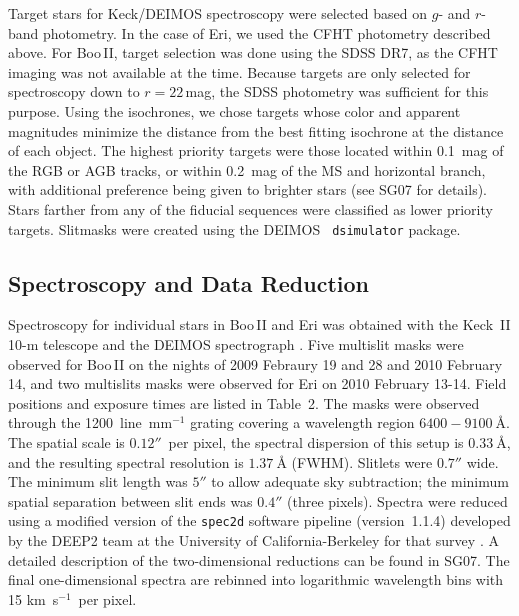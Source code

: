 \documentclass{../tex_files/emulateapj}
\newcommand{\kms}{\,km~s$^{-1}$}
\begin{document}
Target stars for Keck/DEIMOS spectroscopy were selected based on $g$-
and $r$-band photometry.  In the case of Eri, we used the CFHT
photometry described above.  For Boo\,II, target selection was done
using the SDSS DR7, as the CFHT imaging was not available at the time.
Because targets are only selected for spectroscopy down to $r =
22$\,mag, the SDSS photometry was sufficient for this purpose.  Using
the \citet{girardi02a} isochrones, we chose targets whose color and
apparent magnitudes minimize the distance from the best fitting
isochrone at the distance of each object.  The highest priority
targets were those located within 0.1~mag of the RGB or AGB tracks, or
within 0.2~mag of the MS and horizontal branch, with additional
preference being given to brighter stars (see SG07 for details).
Stars farther from any of the fiducial sequences were classified as
lower priority targets. Slitmasks were created using the DEIMOS {\tt
  dsimulator} package.



\subsection{Spectroscopy and Data Reduction}\label{subsec_redux}

Spectroscopy for individual stars in Boo\,II and Eri was obtained
with the Keck~II 10-m telescope and the DEIMOS spectrograph
\citep{faber03a}.  Five multislit masks were observed for Boo\,II on
the nights of 2009 Febraury 19 and 28 and 2010 February 14, and two
multislits masks were observed for Eri on 2010 February 13-14.
Field positions and exposure times are listed in Table~2.  The masks
were observed through the 1200~line~mm$^{-1}$ grating covering a
wavelength region $6400-9100~\mbox{\AA}$.  The spatial scale is
$0.12''$~per pixel, the spectral dispersion of this setup is
$0.33~\mbox{\AA}$, and the resulting spectral resolution is
$1.37~\mbox{\AA}$ (FWHM). Slitlets were $0.7''$ wide.  The minimum
slit length was $5''$ to allow adequate sky subtraction; the minimum
spatial separation between slit ends was $0.4''$ (three pixels).
Spectra were reduced using a modified version of the {\tt spec2d}
software pipeline (version~1.1.4) developed by the DEEP2 team at the
University of California-Berkeley for that survey \citep{newman12a}.   A detailed
description of the two-dimensional reductions can be found in SG07.
The final one-dimensional spectra are rebinned into logarithmic
wavelength bins with 15\,\kms\ per pixel.
\end{document}
